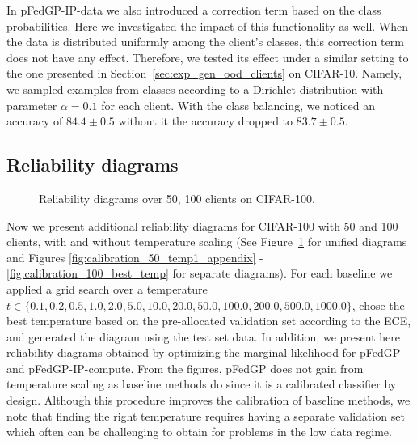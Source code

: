 \documentclass{article}
\def\Figref#1{Figure~\ref{#1}}
\def\Secref#1{Section~\ref{#1}}
\begin{document}
In pFedGP-IP-data we also introduced a correction term based on the class probabilities. Here we investigated the impact of this functionality as well.
When the data is distributed uniformly among the client's classes, this correction term does not have any effect. Therefore, we tested its effect under a similar setting to the one presented in \Secref{sec:exp_gen_ood_clients} on CIFAR-10. Namely, we sampled examples from classes according to a Dirichlet distribution with parameter $\alpha = 0.1$ for each client. With the class balancing, we noticed an accuracy of $84.4 \pm 0.5$ without it the accuracy dropped to $83.7 \pm 0.5$.

\subsection{Reliability diagrams} \label{sec:reliability_diad_appendix}
\begin{figure}[!t]
\centering
\tiny
{}
\caption{Reliability diagrams over 50, 100 clients on CIFAR-100.}
\label{fig:calibration_all}
\end{figure}





Now we present additional reliability diagrams for CIFAR-100 with 50 and 100 clients, with and without temperature scaling (See \Figref{fig:calibration_all} for unified diagrams and Figures \ref{fig:calibration_50_temp1_appendix} - \ref{fig:calibration_100_best_temp} for separate diagrams). For each baseline we applied a grid search over a temperature $t \in \{0.1, 0.2, 0.5, 1.0, 2.0, 5.0, 10.0, 20.0, 50.0, 100.0, 200.0, 500.0, 1000.0\}$, chose the best temperature based on the pre-allocated validation set according to the ECE, and generated the diagram using the test set data. In addition, we present here reliability diagrams obtained by optimizing the marginal likelihood for pFedGP and pFedGP-IP-compute. From the figures, pFedGP does not gain from temperature scaling as baseline methods do since it is a calibrated classifier by design. Although this procedure improves the calibration of baseline methods, we note that finding the right temperature requires having a separate validation set which often can be challenging to obtain for problems in the low data regime.
\end{document}
